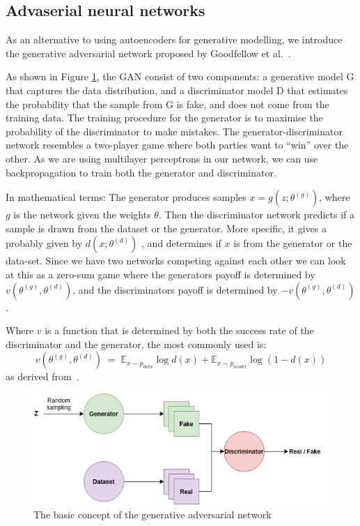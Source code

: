     
\subsection{Advaserial neural networks}
\label{cha:Explaining_GANS}
As an alternative to using autoencoders for generative modelling, we introduce the generative adversarial network proposed by Goodfellow et al.~\cite{Goodfellow:2014:GAN:2969033.2969125}.

As shown in Figure \ref{fig:GAN}, the GAN consist of two components: a generative model G that captures the data distribution, and a discriminator model D that estimates the probability that the sample from G is fake, and does not come from the training data. The training procedure for the generator is to maximise the probability of the discriminator to make mistakes.
The generator-discriminator network resembles a two-player game where both parties want to ``win'' over the other.
As we are using multilayer perceptrons in our network, we can use backpropagation to train both the generator and discriminator. 

In mathematical terms:
The generator produces samples $x=g(z;\theta^{(g)})$, where $g$ is the network given the weights $\theta$. Then the discriminator network predicts if a sample is drawn from the dataset or the generator.
More specific, it gives a probably given by $d(x;\theta^{(d)})$ , and determines if $x$ is from the generator or the data-set. 
Since we have two networks competing against each other we can look at this as a zero-sum game where the generators payoff is determined by $v(\theta^{(g)},\theta^{(d)})$, and the discriminators payoff is determined by $-v(\theta^{(g)},\theta^{(d)})$.

Where $v$ is a function that is determined by both the success rate of the discriminator and the generator, the most commonly used is:
\begin{equation} 
    v(\theta^{(g)},\theta^{(d)}) \; = \; \mathds{E}_{x\sim p_{data}}\log{d(x)} + \mathds{E}_{x\sim p_{model}}\log{(1 - d(x))} 
\end{equation}
as derived from~\cite{Goodfellow:2014:GAN:2969033.2969125}.


\begin{figure}[ht!]
    \centering
    \includegraphics[scale=0.6]{background/figures/GAN.png}
    \caption{The basic concept of the generative adversarial network}
    \label{fig:GAN}
\end{figure}



